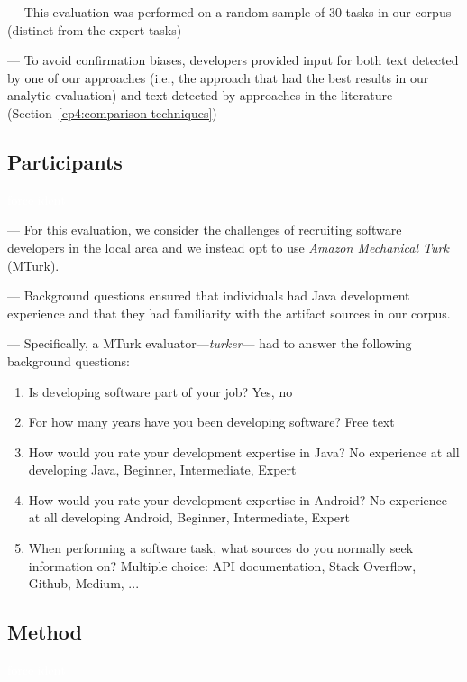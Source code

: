 --- This evaluation was performed on a random sample of 30 tasks in our corpus (distinct from the expert tasks)

--- To avoid confirmation biases, developers provided input for both text detected by one of our approaches (i.e., the approach that had the best results in our analytic evaluation) and text detected by approaches in the literature (Section~\ref{cp4:comparison-techniques})



\subsection{Participants}
\textcolor{white}{force ident} %

--- For this evaluation, we consider the challenges of recruiting software developers in the local area and we instead opt to use 
\textit{Amazon Mechanical Turk}~\cite{mturk} (MTurk).

--- Background questions ensured that individuals had Java development experience and that they had familiarity with the artifact sources in our corpus.

--- Specifically, a MTurk evaluator---\textit{turker}--- had to answer the following background questions:


\begin{enumerate}[leftmargin=\parindent, font=\normalfont\itshape, label=BQ\textsubscript{\arabic*.}]
    \item Is developing software part of your job? Yes, no 
    \item For how many years have you been developing software? Free text
    \item How would you rate your development expertise in Java? No experience at all developing Java, Beginner, Intermediate, Expert
    \item How would you rate your development expertise in Android? No experience at all developing Android, Beginner, Intermediate, Expert
    \item When performing a software task, what sources do you normally seek information on? Multiple choice: API documentation, Stack Overflow, Github, Medium, ...
\end{enumerate}

   

\subsection{Method}
\textcolor{white}{force ident} %


